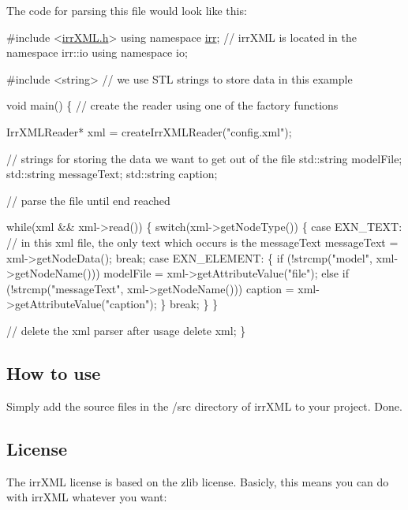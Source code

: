 The code for parsing this file would look like this\+: 
\begin{DoxyCode}
\textcolor{preprocessor}{#include <\hyperlink{irr_x_m_l_8h}{irrXML.h}>}
\textcolor{keyword}{using namespace }\hyperlink{namespaceirr}{irr}; \textcolor{comment}{// irrXML is located in the namespace irr::io}
\textcolor{keyword}{using namespace }io;

\textcolor{preprocessor}{#include <string>} \textcolor{comment}{// we use STL strings to store data in this example}

\textcolor{keywordtype}{void} main()
\{
 \textcolor{comment}{// create the reader using one of the factory functions}

 IrrXMLReader* xml = createIrrXMLReader(\textcolor{stringliteral}{"config.xml"});

 \textcolor{comment}{// strings for storing the data we want to get out of the file}
 std::string modelFile;
 std::string messageText;
 std::string caption;

 \textcolor{comment}{// parse the file until end reached}

 \textcolor{keywordflow}{while}(xml && xml->read())
 \{
     \textcolor{keywordflow}{switch}(xml->getNodeType())
     \{
     \textcolor{keywordflow}{case} EXN\_TEXT:
         \textcolor{comment}{// in this xml file, the only text which occurs is the messageText}
         messageText = xml->getNodeData();
         \textcolor{keywordflow}{break};
     \textcolor{keywordflow}{case} EXN\_ELEMENT:
         \{
             \textcolor{keywordflow}{if} (!strcmp(\textcolor{stringliteral}{"model"}, xml->getNodeName()))
                 modelFile = xml->getAttributeValue(\textcolor{stringliteral}{"file"});
             \textcolor{keywordflow}{else}
             \textcolor{keywordflow}{if} (!strcmp(\textcolor{stringliteral}{"messageText"}, xml->getNodeName()))
                 caption = xml->getAttributeValue(\textcolor{stringliteral}{"caption"});
         \}
         \textcolor{keywordflow}{break};
     \}
 \}

 \textcolor{comment}{// delete the xml parser after usage}
 \textcolor{keyword}{delete} xml;
\}
\end{DoxyCode}
\hypertarget{irrXML.h_howto}{}\subsection{How to use}\label{irrXML.h_howto}
Simply add the source files in the /src directory of irr\+X\+M\+L to your project. Done.\hypertarget{irrXML.h_license}{}\subsection{License}\label{irrXML.h_license}
The irr\+X\+M\+L license is based on the zlib license. Basicly, this means you can do with irr\+X\+M\+L whatever you want\+:

